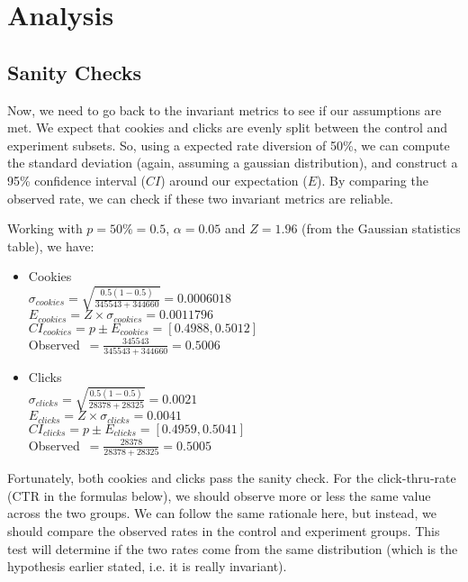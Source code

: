 \documentclass[11pt]{article}
\begin{document}
\section{Analysis} \label{sec:analysis}

	\subsection{Sanity Checks}
	
		Now, we need to go back to the invariant metrics to see if our assumptions are met.
		We expect that cookies and clicks are evenly split between the control and experiment subsets.
		So, using a expected rate diversion of 50\%, we can compute the standard deviation (again, assuming a gaussian distribution), and construct a 95\% confidence interval ($CI$) around our expectation ($E$). 
		By comparing the observed rate, we can check if these two invariant metrics are reliable.
		
		Working with $p= 50\% = 0.5$, $\alpha = 0.05$ and $Z=1.96$ (from the Gaussian statistics table), we have:
		
		\begin{itemize}
			\item Cookies\\
			$\sigma_{cookies} = \sqrt{\frac{0.5(1-0.5)}{345543+344660}} = 0.0006018$\\
			$E_{cookies} = Z \times \sigma_{cookies} = 0.0011796$\\
			$CI_{cookies} = p \pm E_{cookies} = [0.4988, 0.5012]$\\
			Observed~$= \frac{345543}{345543+344660} = 0.5006$\\
			\item Clicks\\
			$\sigma_{clicks} = \sqrt{\frac{0.5(1-0.5)}{28378+28325}} = 0.0021$\\
			$E_{clicks} = Z \times \sigma_{clicks} = 0.0041$\\
			$CI_{clicks} = p \pm E_{clicks} = [0.4959, 0.5041]$\\
			Observed~$= \frac{28378}{28378+28325} = 0.5005$\\			
		\end{itemize}
	
		Fortunately, both cookies and clicks pass the sanity check.
		For the click-thru-rate (CTR in the formulas below), we should observe more or less the same value across the two groups.
		We can follow the same rationale here, but instead, we should compare the observed rates in the control and experiment groups.
		This test will determine if the two rates come from the same distribution (which is the hypothesis earlier stated, i.e. it is really invariant).
		 
\end{document}
